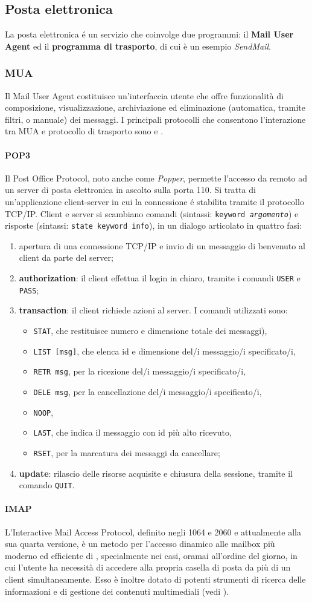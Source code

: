 \documentclass[a4paper, twoside]{article}
\def\code#1{\texttt{#1}}
\def\sub#1{\subsection{#1}\label{#1}}
\def\subsub#1{\subsubsection{#1}\label{#1}}
\def\para#1{\paragraph{#1}\label{#1}}
\def\vedi#1{\nameref{#1}}
\begin{document}
\sub {Posta elettronica}
La posta elettronica \'e un servizio che coinvolge due programmi: il \textbf{Mail User Agent} ed il \textbf{programma di trasporto}, di cui è un esempio \textit{SendMail}. 
\subsub{MUA} Il Mail User Agent costituisce un'interfaccia utente che offre funzionalità di composizione, visualizzazione, archiviazione ed eliminazione (automatica, tramite filtri, o manuale) dei messaggi.
I principali protocolli che consentono l'interazione tra MUA e protocollo di trasporto sono \vedi{POP3} e \vedi{IMAP}. 
\para{POP3}
Il Post Office Protocol, noto anche come \textit{Popper}, permette l'accesso da remoto ad un server di posta elettronica in ascolto sulla porta 110.
Si tratta di un'applicazione client-server in cui la connessione \'e stabilita tramite il protocollo TCP/IP. Client e server si scambiano comandi (sintassi: \code{keyword \textit{argomento}}) e risposte (sintassi: \code{state keyword info}), in un dialogo articolato in quattro fasi:
\begin{enumerate}
\item apertura di una connessione TCP/IP e invio di un messaggio di benvenuto al client da parte del server;
\item \textbf{authorization}: il client effettua il login in chiaro, tramite i comandi \code{USER} e \code{PASS};
\item \textbf{transaction}: il client richiede azioni al server. I comandi utilizzati sono:
\begin{itemize}
\item \code{STAT}, che restituisce numero e dimensione totale dei messaggi),
\item \code{LIST [msg]}, che elenca id e dimensione del/i messaggio/i specificato/i,
\item \code{RETR msg}, per la ricezione del/i messaggio/i specificato/i,
\item \code{DELE msg}, per la cancellazione del/i messaggio/i specificato/i,
\item \code{NOOP},
\item \code{LAST}, che indica il messaggio con id più alto ricevuto,
\item \code{RSET}, per la marcatura dei messaggi da cancellare;
\end{itemize}
\item \textbf{update}: rilascio delle risorse acquisite e chiusura della sessione, tramite il comando \code{QUIT}.
\end{enumerate}
\para{IMAP}
L'Interactive Mail Access Protocol, definito negli \vedi{RFC} 1064 e 2060 e attualmente alla sua quarta versione, è un metodo per l'accesso dinamico alle mailbox più moderno ed efficiente di \vedi{POP3}, specialmente nei casi, oramai all'ordine del giorno, in cui l'utente ha necessità di accedere alla propria casella di posta da più di un client simultaneamente. Esso è inoltre dotato di potenti strumenti di ricerca delle informazioni e di gestione dei contenuti multimediali (vedi \vedi{MIME}). 
\end{document}
